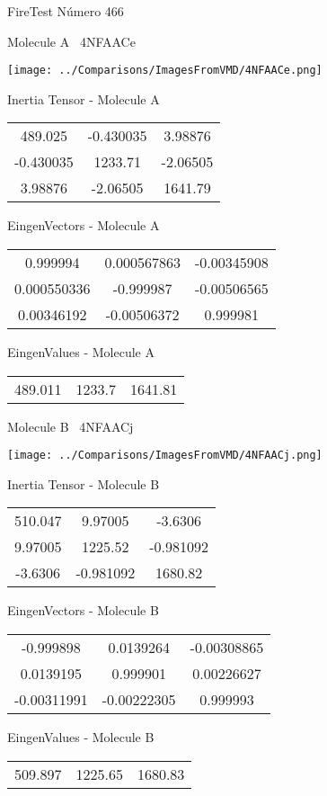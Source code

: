 \vtab[-3cm]
\begin{center}
{\large FireTest \tab Número 466}
\end{center}
\begin{multicols}{2}
\begin{center}

Molecule A \
4NFAACe

\texttt{[image: ../Comparisons/ImagesFromVMD/4NFAACe.png]}

Inertia Tensor - Molecule A \\
\begin{tabular}{|c c c|}
489.025	 & 	-0.430035	 & 	3.98876	 \\
-0.430035	 & 	1233.71	 & 	-2.06505	 \\
3.98876	 & 	-2.06505	 & 	1641.79
\end{tabular}

\vtab
 EingenVectors - Molecule A     \\
\begin{tabular}{|c c c|}
0.999994	 & 	0.000567863	 & 	-0.00345908	 \\
0.000550336	 & 	-0.999987	 & 	-0.00506565	 \\
0.00346192	 & 	-0.00506372	 & 	0.999981
\end{tabular}

\vtab
 EingenValues - Molecule A     \\
\begin{tabular}{|c c c|}
489.011	 & 	1233.7	 & 	1641.81	 \\
\end{tabular}
\columnbreak

Molecule B \
4NFAACj

\texttt{[image: ../Comparisons/ImagesFromVMD/4NFAACj.png]}

Inertia Tensor - Molecule B \\
\begin{tabular}{|c c c|}
510.047	 & 	9.97005	 & 	-3.6306	 \\
9.97005	 & 	1225.52	 & 	-0.981092	 \\
-3.6306	 & 	-0.981092	 & 	1680.82
\end{tabular}

\vtab
 EingenVectors - Molecule B     \\
\begin{tabular}{|c c c|}
-0.999898	 & 	0.0139264	 & 	-0.00308865	 \\
0.0139195	 & 	0.999901	 & 	0.00226627	 \\
-0.00311991	 & 	-0.00222305	 & 	0.999993
\end{tabular}

\vtab
 EingenValues - Molecule B     \\
\begin{tabular}{|c c c|}
509.897	 & 	1225.65	 & 	1680.83	 \\
\end{tabular}

\end{center}
\end{multicols}

